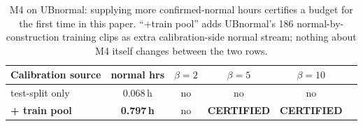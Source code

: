 \begin{table}[t]
\centering
\caption{M4 on UBnormal: supplying more confirmed-normal hours certifies a
budget for the first time in this paper. ``+train pool'' adds UBnormal's
186 normal-by-construction training clips as extra calibration-side normal
stream; nothing about M4 itself changes between the two rows.}
\label{tab:rc-ub}
\setlength{\tabcolsep}{4pt}
\renewcommand{\arraystretch}{1.15}
\footnotesize
\begin{tabular}{@{}lccccc@{}}
\toprule
Calibration source & normal hrs & $\beta{=}2$ & $\beta{=}5$ & $\beta{=}10$ \\
\midrule
test-split only        & 0.068\,h & no & no & no \\
\textbf{+ train pool}  & \textbf{0.797\,h} & no & \textbf{CERTIFIED} & \textbf{CERTIFIED} \\
\bottomrule
\end{tabular}
\end{table}
